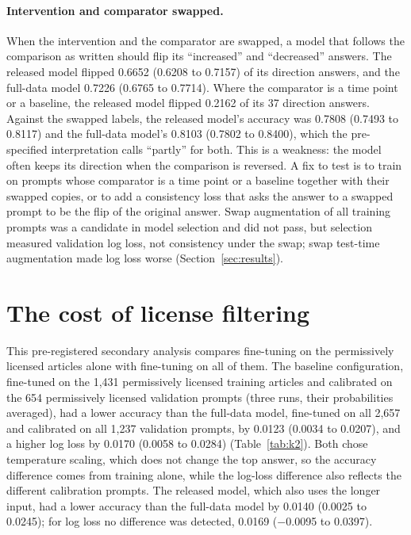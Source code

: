 \documentclass[11pt,letterpaper]{article}
\begin{document}
\paragraph{Intervention and comparator swapped.} When the intervention and the comparator are swapped, a model that follows the comparison as written should flip its ``increased'' and ``decreased'' answers. The released model flipped 0.6652 (0.6208 to 0.7157) of its direction answers, and the full-data model 0.7226 (0.6765 to 0.7714). Where the comparator is a time point or a baseline, the released model flipped 0.2162 of its 37 direction answers. Against the swapped labels, the released model's accuracy was 0.7808 (0.7493 to 0.8117) and the full-data model's 0.8103 (0.7802 to 0.8400), which the pre-specified interpretation calls ``partly'' for both. This is a weakness: the model often keeps its direction when the comparison is reversed. A fix to test is to train on prompts whose comparator is a time point or a baseline together with their swapped copies, or to add a consistency loss that asks the answer to a swapped prompt to be the flip of the original answer. Swap augmentation of all training prompts was a candidate in model selection and did not pass, but selection measured validation log loss, not consistency under the swap; swap test-time augmentation made log loss worse (Section~\ref{sec:results}).

\section{The cost of license filtering}
\label{sec:license}

This pre-registered secondary analysis compares fine-tuning on the permissively licensed articles alone with fine-tuning on all of them. The baseline configuration, fine-tuned on the 1,431 permissively licensed training articles and calibrated on the 654 permissively licensed validation prompts (three runs, their probabilities averaged), had a lower accuracy than the full-data model, fine-tuned on all 2,657 and calibrated on all 1,237 validation prompts, by 0.0123 (0.0034 to 0.0207), and a higher log loss by 0.0170 (0.0058 to 0.0284) (Table~\ref{tab:k2}). Both chose temperature scaling, which does not change the top answer, so the accuracy difference comes from training alone, while the log-loss difference also reflects the different calibration prompts. The released model, which also uses the longer input, had a lower accuracy than the full-data model by 0.0140 (0.0025 to 0.0245); for log loss no difference was detected, 0.0169 ($-$0.0095 to 0.0397).
\end{document}
